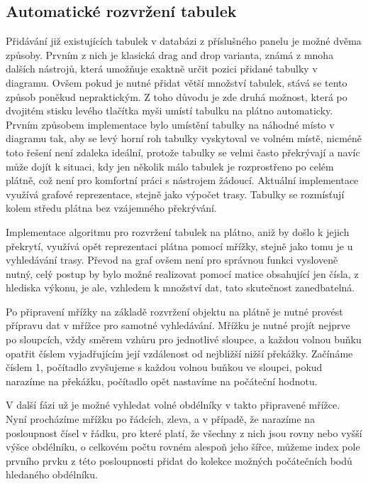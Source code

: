 \documentclass[czech,bachelor,public,dept460,male,oneside]{diploma}
\begin{document}
	\subsection{Automatické rozvržení tabulek} \label{secTablePos}
	Přidávání již existujících tabulek v databázi z příslušného panelu je možné dvěma způsoby. Prvním z nich je klasická drag and drop varianta, známá z mnoha dalších nástrojů, která umožňuje exaktně určit pozici přidané tabulky v diagramu. Ovšem pokud je nutné přidat větší množství tabulek, stává se tento způsob poněkud nepraktickým. Z toho důvodu je zde druhá možnost, která po dvojitém stisku levého tlačítka myši umístí tabulku na plátno automaticky. Prvním způsobem implementace bylo umístění tabulky na náhodné místo v diagramu tak, aby se levý horní roh tabulky vyskytoval ve volném místě, nicméně toto řešení není zdaleka ideální, protože tabulky se velmi často překrývají a navíc může dojít k situaci, kdy jen několik málo tabulek je rozprostřeno po celém plátně, což není pro komfortní práci s nástrojem žádoucí. Aktuální implementace využívá grafové reprezentace, stejně jako výpočet trasy. Tabulky se rozmísťují kolem středu plátna  bez vzájemného překrývání. 
	
	Implementace algoritmu pro rozvržení tabulek na plátno, aniž by došlo k jejich překrytí, využívá opět reprezentaci plátna pomocí mřížky, stejně jako tomu je u vyhledávání trasy. Převod na graf ovšem není pro správnou funkci vysloveně nutný, celý postup by bylo možné realizovat pomocí matice obsahující jen čísla, z hlediska výkonu, je ale, vzhledem k množství dat, tato skutečnost zanedbatelná. 
	
	Po připravení mřížky na základě rozvržení objektu na plátně je nutné provést přípravu dat v mřížce pro samotné vyhledávání. Mřížku je nutné projít nejprve po sloupcích, vždy směrem vzhůru pro jednotlivé sloupce, a každou volnou buňku opatřit číslem vyjadřujícím její vzdálenost od nejbližší nižší překážky. Začínáme číslem 1, počítadlo zvyšujeme s každou volnou buňkou ve sloupci, pokud narazíme na překážku, počítadlo opět nastavíme na počáteční hodnotu. 
	
	V další fázi už je možné vyhledat volné obdélníky v takto připravené mřížce. Nyní procházíme mřížku po řádcích, zleva, a v případě, že narazíme na posloupnost čísel v řádku, pro které platí, že všechny z nich jsou rovny nebo vyšší výšce obdélníku, o celkovém počtu rovném alespoň jeho šířce, můžeme index pole prvního prvku z této posloupnosti přidat do kolekce možných počátečních bodů hledaného obdélníku.
	
\end{document}
